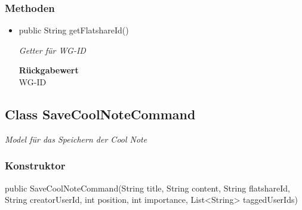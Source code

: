 \documentclass[a4paper]{scrreprt}
\begin{document}
        \subsubsection{Methoden}
        \begin{itemize}
        	\item{public String getFlatshareId()}
        	
        	\textit{Getter für WG-ID}
        	
        	
        	
        	\textbf{Rückgabewert} \\
        	WG-ID
        \end{itemize}
        \subsection{Class SaveCoolNoteCommand}
        \textit{Model für das Speichern der Cool Note}
        \subsubsection{Konstruktor}
        public SaveCoolNoteCommand(String title, String content, String flatshareId, String creatorUserId, int position, int importance, List<String> taggedUserIds)
\end{document}
